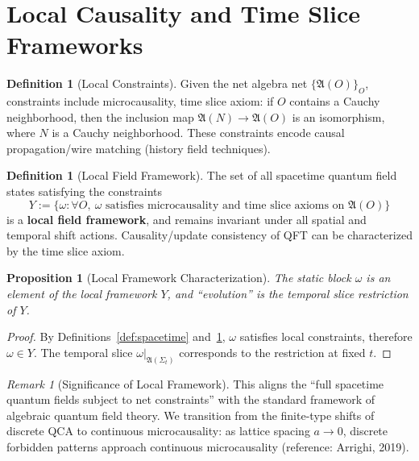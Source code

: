 \documentclass[11pt]{article}
\newtheorem{proposition}[theorem]{Proposition}
\theoremstyle{definition}
\newtheorem{definition}[theorem]{Definition}
\theoremstyle{remark}
\newtheorem{remark}[theorem]{Remark}
\begin{document}
\section{Local Causality and Time Slice Frameworks}\label{sec:causality}

\begin{definition}[Local Constraints]\label{def:constraints}
Given the net algebra net \( \{\mathfrak{A}(O)\}_O \), constraints include microcausality, time slice axiom: if \( O \) contains a Cauchy neighborhood, then the inclusion map \( \mathfrak{A}(N) \to \mathfrak{A}(O) \) is an isomorphism, where \( N \) is a Cauchy neighborhood. These constraints encode causal propagation/wire matching (history field techniques).
\end{definition}

\begin{definition}[Local Field Framework]\label{def:framework}
The set of all spacetime quantum field states satisfying the constraints
\[
Y := \{ \omega : \forall O, \ \omega \text{ satisfies microcausality and time slice axioms on } \mathfrak{A}(O) \}
\]
is a \textbf{local field framework}, and remains invariant under all spatial and temporal shift actions. Causality/update consistency of QFT can be characterized by the time slice axiom.
\end{definition}

\begin{proposition}[Local Framework Characterization]\label{prop:framework}
The static block \( \omega \) is an element of the local framework \( Y \), and ``evolution'' is the temporal slice restriction of \( Y \).
\end{proposition}

\begin{proof}
By Definitions~\ref{def:spacetime} and~\ref{def:constraints}, \( \omega \) satisfies local constraints, therefore \( \omega \in Y \). The temporal slice \( \omega|_{\mathfrak{A}(\Sigma_t)} \) corresponds to the restriction at fixed \( t \).
\end{proof}

\begin{remark}[Significance of Local Framework]
This aligns the ``full spacetime quantum fields subject to net constraints'' with the standard framework of algebraic quantum field theory. We transition from the finite-type shifts of discrete QCA to continuous microcausality: as lattice spacing \( a \to 0 \), discrete forbidden patterns approach continuous microcausality (reference: Arrighi, 2019).
\end{remark}
\end{document}
